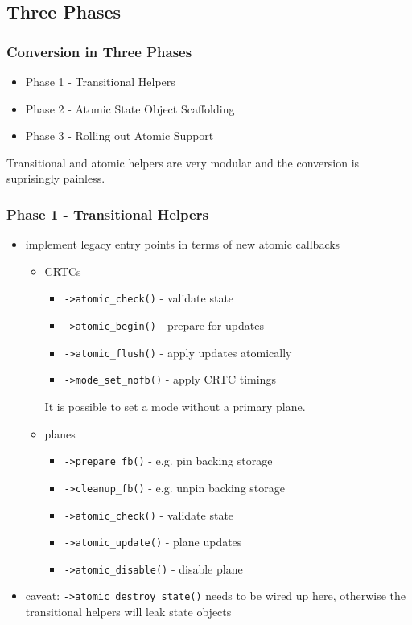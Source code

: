 \documentclass[t]{beamer}
\begin{document}
\subsection{Three Phases}

\begin{frame}
	\frametitle{Conversion in Three Phases}
	\begin{itemize}
		\item Phase 1 - Transitional Helpers
		\item Phase 2 - Atomic State Object Scaffolding
		\item Phase 3 - Rolling out Atomic Support
	\end{itemize}
	Transitional and atomic helpers are very modular and the conversion is
	suprisingly painless.
\end{frame}

\begin{frame}
	\frametitle{Phase 1 - Transitional Helpers}
	\begin{itemize}
		\item implement legacy entry points in terms of new atomic callbacks
			\begin{itemize}
				\item CRTCs
					\begin{itemize}
						\item {\tt ->atomic\_check()} - validate state
						\item {\tt ->atomic\_begin()} - prepare for updates
						\item {\tt ->atomic\_flush()} - apply updates atomically
						\item {\tt ->mode\_set\_nofb()} - apply CRTC timings
					\end{itemize}
					It is possible to set a mode without a primary plane.
				\item planes
					\begin{itemize}
						\item {\tt ->prepare\_fb()} - e.g. pin backing storage
						\item {\tt ->cleanup\_fb()} - e.g. unpin backing storage
						\item {\tt ->atomic\_check()} - validate state
						\item {\tt ->atomic\_update()} - plane updates
						\item {\tt ->atomic\_disable()} - disable plane
					\end{itemize}
			\end{itemize}
		\item caveat: {\tt ->atomic\_destroy\_state()} needs to be wired up
			here, otherwise the transitional helpers will leak state objects
	\end{itemize}
\end{frame}
\end{document}
